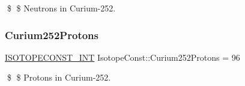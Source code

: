 \$ \$ Neutrons in Curium-\/252. \mbox{\label{group___isotope_const-_curium-_cm252_ga0a4f0cbbffc38e09075f3d9a99787805}} 
\subsubsection{\texorpdfstring{Curium252\+Protons}{Curium252Protons}}
{\footnotesize\ttfamily \mbox{\hyperlink{group___isotope_const-_macros_ga5f18360b3e99483a35c32d789e62621c}{I\+S\+O\+T\+O\+P\+E\+C\+O\+N\+S\+T\+\_\+\+I\+NT}} Isotope\+Const\+::\+Curium252\+Protons = 96}

\$ \$ Protons in Curium-\/252. 